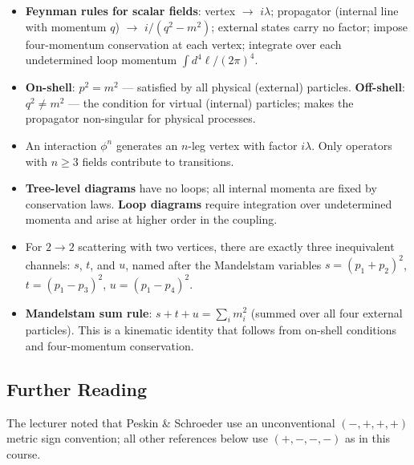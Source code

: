 \documentclass[../main.tex]{subfiles}
\begin{document}
\begin{itemize}
  \item \textbf{Feynman rules for scalar fields}: vertex $\to$ $i\lambda$; propagator (internal line with momentum $q$) $\to$ $i/(q^2 - m^2)$; external states carry no factor; impose four-momentum conservation at each vertex; integrate over each undetermined loop momentum $\int d^4\ell/(2\pi)^4$.

  \item \textbf{On-shell}: $p^2 = m^2$ — satisfied by all physical (external) particles.
  \textbf{Off-shell}: $q^2 \neq m^2$ — the condition for virtual (internal) particles; makes the propagator non-singular for physical processes.

  \item An interaction $\phi^n$ generates an $n$-leg vertex with factor $i\lambda$.  Only operators with $n \geq 3$ fields contribute to transitions.

  \item \textbf{Tree-level diagrams} have no loops; all internal momenta are fixed by conservation laws.  \textbf{Loop diagrams} require integration over undetermined momenta and arise at higher order in the coupling.

  \item For $2 \to 2$ scattering with two vertices, there are exactly three inequivalent channels: $s$, $t$, and $u$, named after the Mandelstam variables $s = (p_1+p_2)^2$, $t = (p_1-p_3)^2$, $u = (p_1-p_4)^2$.

  \item \textbf{Mandelstam sum rule}: $s + t + u = \sum_i m_i^2$ (summed over all four external particles).  This is a kinematic identity that follows from on-shell conditions and four-momentum conservation.
\end{itemize}

\subsection*{Further Reading}

The lecturer noted that Peskin \& Schroeder use an unconventional $(-,+,+,+)$ metric
sign convention; all other references below use $(+,-,-,-)$ as in this course.
\end{document}
